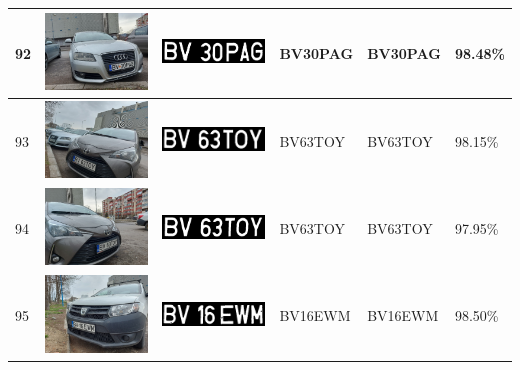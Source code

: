 \documentclass[a4paper,12pt]{report}
\begin{document}
\begin{longtable}{| m{0.6cm} | m{3cm} | m{3cm} | m{1.8cm} | m{1.8cm} | m{1.8cm} |}
    92  & \includegraphics[width=3cm,keepaspectratio]{dataset/54_s1.jpg}  & \includegraphics[width=3cm,keepaspectratio]{segmentari/92.jpg}  & BV30PAG             & BV30PAG              & 98.48\%    \\ \hline
    93  & \includegraphics[width=3cm,keepaspectratio]{dataset/55_d1.jpg}  & \includegraphics[width=3cm,keepaspectratio]{segmentari/93.jpg}  & BV63TOY             & BV63TOY              & 98.15\%    \\ \hline
    94  & \includegraphics[width=3cm,keepaspectratio]{dataset/55_s1.jpg}  & \includegraphics[width=3cm,keepaspectratio]{segmentari/94.jpg}  & BV63TOY             & BV63TOY              & 97.95\%    \\ \hline
    95  & \includegraphics[width=3cm,keepaspectratio]{dataset/56_d1.jpg}  & \includegraphics[width=3cm,keepaspectratio]{segmentari/95.jpg}  & BV16EWM             & BV16EWM              & 98.50\%    \\ \hline

\end{longtable}
\end{document}
